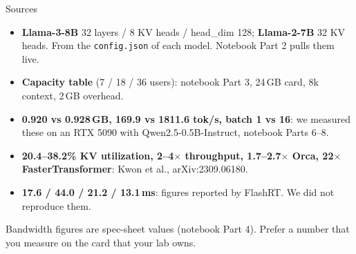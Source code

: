 \documentclass[aspectratio=169,10pt]{beamer}
\begin{document}
\begin{frame}{Sources}
  \small
  \begin{itemize}
    \item \textbf{Llama-3-8B} 32 layers / 8 KV heads / head\_dim 128;
          \textbf{Llama-2-7B} 32 KV heads. From the
          \texttt{config.json} of each model. Notebook Part 2 pulls them live.
    \item \textbf{Capacity table} (7 / 18 / 36 users): notebook Part 3,
          24\,GB card, 8k context, 2\,GB overhead.
    \item \textbf{0.920 vs 0.928\,GB, 169.9 vs 1811.6 tok/s, batch 1
          vs 16}: we measured these on an RTX 5090 with Qwen2.5-0.5B-Instruct,
          notebook Parts 6--8.
    \item \textbf{20.4--38.2\% KV utilization, 2--4$\times$ throughput,
          1.7--2.7$\times$ Orca, 22$\times$ FasterTransformer}: Kwon et al.,
          arXiv:2309.06180.
    \item \textbf{17.6 / 44.0 / 21.2 / 13.1\,ms}: figures reported by FlashRT.
          We did not reproduce them.
  \end{itemize}
  \vspace{0.5em}
  \begin{center}\footnotesize
    Bandwidth figures are spec-sheet values (notebook Part 4).
    Prefer a number that you measure on the card that your lab owns.
  \end{center}
\end{frame}
\end{document}
